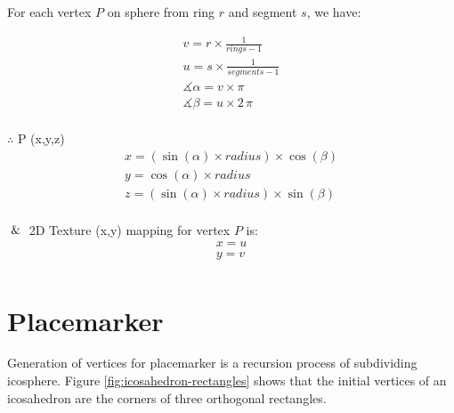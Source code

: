 For each vertex $P$ on sphere from ring $r$ and segment $s$, we have:

\[
\begin{array}{lr}
v = r \times  \frac{1}{rings - 1}\\
u = s \times  \frac{1}{segments - 1}\\
\measuredangle \alpha = v \times \pi\\
\measuredangle \beta = u \times 2\,\pi\\
\end{array}
\]

$\therefore$ P (x,\;y,\;z)
\[
\begin{array}{lr}
x = (\sin(\alpha) \times radius) \times \cos(\beta)\\
y = \cos(\alpha) \times radius\\
z =  (\sin(\alpha) \times radius) \times \sin(\beta)\\
\end{array}
\]

$\And$ 2D Texture (x,\;y) mapping for vertex $P$ is:
\[
\begin{array}{lr}
x = u\\
y = v\\
\end{array}
\]

\section{Placemarker}

Generation of vertices for placemarker is a recursion process of subdividing icosphere. Figure \ref{fig:icosahedron-rectangles} shows that the initial vertices of an icosahedron are the corners of three orthogonal rectangles.

